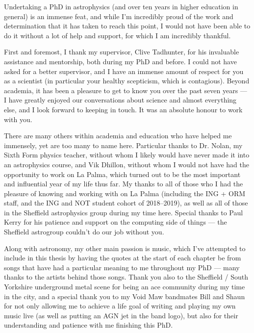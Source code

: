 \thispagestyle{empty}
Undertaking a PhD in astrophysics (and over ten years in higher education in general) is an immense feat, and while I'm incredibly proud of the work and determination that it has taken to reach this point, I would not have been able to do it without a lot of help and support, for which I am incredibly thankful.

First and foremost, I thank my supervisor, Clive Tadhunter, for his invaluable assistance and mentorship, both during my PhD and before. I could not have asked for a better supervisor, and I have an immense amount of respect for you as a scientist (in particular your healthy scepticism, which is contagious). Beyond academia, it has been a pleasure to get to know you over the past seven years --- I have greatly enjoyed our conversations about science and almost everything else, and I look forward to keeping in touch. It was an absolute honour to work with you.

There are many others within academia and education who have helped me immensely, yet are too many to name here. Particular thanks to Dr. Nolan, my Sixth Form physics teacher, without whom I likely would have never made it into an astrophysics course, and Vik Dhillon, without whom I would not have had the opportunity to work on La Palma, which turned out to be the most important and influential year of my life thus far. My thanks to all of those who I had the pleasure of knowing and working with on La Palma (including the ING + ORM staff, and the ING and NOT student cohort of 2018--2019), as well as all of those in the Sheffield astrophysics group during my time here. Special thanks to Paul Kerry for his patience and support on the computing side of things --- the Sheffield astrogroup couldn't do our job without you.

Along with astronomy, my other main passion is music, which I've attempted to include in this thesis by having the quotes at the start of each chapter be from songs that have had a particular meaning to me throughout my PhD --- many thanks to the artists behind those songs. Thank you also to the Sheffield / South Yorkshire underground metal scene for being an ace community during my time in the city, and a special thank you to my Void Maw bandmates Bill and Shaun for not only allowing me to achieve a life goal of writing and playing my own music live (as well as putting an AGN jet in the band logo), but also for their understanding and patience with me finishing this PhD.


